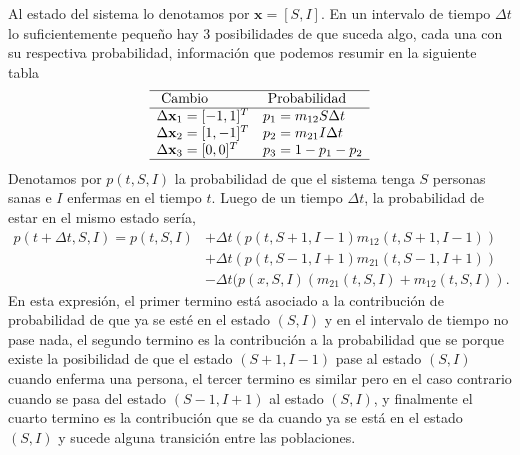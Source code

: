 \documentclass{article}
\begin{document}
\noindent
Al estado del sistema lo denotamos por $\mathbf{x}=[S,I]$.
En un intervalo de tiempo $\Delta t$ lo suficientemente pequeño hay 3 posibilidades de que suceda algo, cada una con su respectiva probabilidad, información que podemos resumir en la siguiente tabla
\begin{equation}\begin{array}{ll}
\hline \text { Cambio } & \text { Probabilidad } \\
\hline \Delta \mathbf{x}_{1}=[-1,1]^{T} & p_{1}=m_{12} S \Delta t \\
\Delta \mathbf{x}_{2}=[1,-1]^{T} & p_{2}=m_{21} I \Delta t \\
\Delta \mathbf{x}_{3}=[0,0]^{T} & p_{3}=1-p_1-p_2 \\
\hline
\end{array}\end{equation}
Denotamos por $p(t,S,I)$ la probabilidad de que el sistema tenga $S$ personas sanas e $I$ enfermas en el tiempo $t$. Luego de un tiempo $\Delta t$, la probabilidad de estar en el mismo estado sería,
\begin{equation}
\begin{aligned}
    p(t+\Delta t,S,I)=p(t,S,I)&+\Delta t (p(t,S+1,I-1)m_{12}(t,S+1,I-1))\\
    &+\Delta t (p(t,S-1,I+1)m_{21}(t,S-1,I+1))\\
    &-\Delta t (p(x,S,I)(m_{21}(t,S,I)+m_{12}(t,S,I)).
\end{aligned}
\end{equation}
\noindent
En esta expresión, el primer termino está asociado a la contribución de probabilidad de que ya se esté en el estado $(S,I)$ y en el intervalo de tiempo no pase nada, el segundo termino es la contribución a la probabilidad que se porque existe la posibilidad de que el estado $(S+1,I-1)$ pase al estado $(S,I)$ cuando enferma una persona, el tercer termino es similar pero en el caso contrario cuando se pasa del estado $(S-1,I+1)$ al estado $(S,I)$, y finalmente el cuarto termino es la contribución que se da cuando ya se está en el estado $(S,I)$ y sucede alguna transición entre las poblaciones.\\
\end{document}
